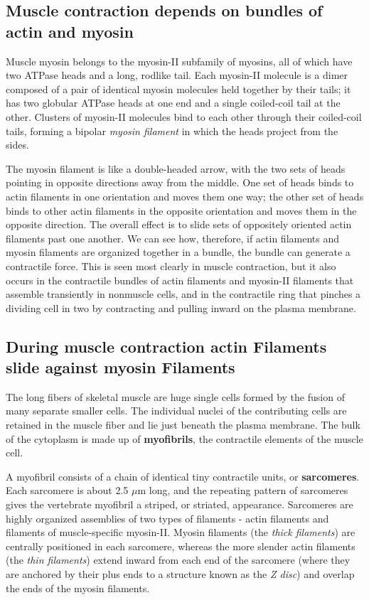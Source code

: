 \subsection{Muscle contraction depends on bundles of actin and myosin}

Muscle myosin belongs to the myosin-II subfamily of myosins, all of which
have two ATPase heads and a long, rodlike tail. Each
myosin-II molecule is a dimer composed of a pair of identical myosin
molecules held together by their tails; it has two globular ATPase heads
at one end and a single coiled-coil tail at the other. Clusters of myosin-II
molecules bind to each other through their coiled-coil tails, forming a
bipolar \textit{myosin filament} in which the heads project from the sides.

The myosin filament is like a double-headed arrow, with the two sets of
heads pointing in opposite directions away from the middle. One set of
heads binds to actin filaments in one orientation and moves them one
way; the other set of heads binds to other actin filaments in the opposite
orientation and moves them in the opposite direction. The
overall effect is to slide sets of oppositely oriented actin filaments past
one another. We can see how, therefore, if actin filaments and myosin
filaments are organized together in a bundle, the bundle can generate a
contractile force. This is seen most clearly in muscle contraction, but it
also occurs in the contractile bundles of actin filaments and myosin-II filaments
that assemble transiently in nonmuscle cells,
and in the contractile ring that pinches a dividing cell in two by contracting
and pulling inward on the plasma membrane.

\subsection{During muscle contraction actin Filaments slide against myosin Filaments}

The long fibers of skeletal muscle are huge single cells formed by the
fusion of many separate smaller cells. The individual nuclei of the contributing
cells are retained in the muscle fiber and lie just beneath the
plasma membrane. The bulk of the cytoplasm is made up of \textbf{myofibrils},
the contractile elements of the muscle cell.

A myofibril consists of a chain of identical tiny contractile units, or \textbf{sarcomeres}.
Each sarcomere is about 2.5 $\mu$m long, and the repeating pattern
of sarcomeres gives the vertebrate myofibril a striped, or striated, appearance.
Sarcomeres are highly organized assemblies of
two types of filaments - actin filaments and filaments of muscle-specific
myosin-II. Myosin filaments (the \textit{thick filaments}) are centrally positioned
in each sarcomere, whereas the more slender actin filaments (the \textit{thin
filaments}) extend inward from each end of the sarcomere (where they
are anchored by their plus ends to a structure known as the \textit{Z disc}) and
overlap the ends of the myosin filaments.

